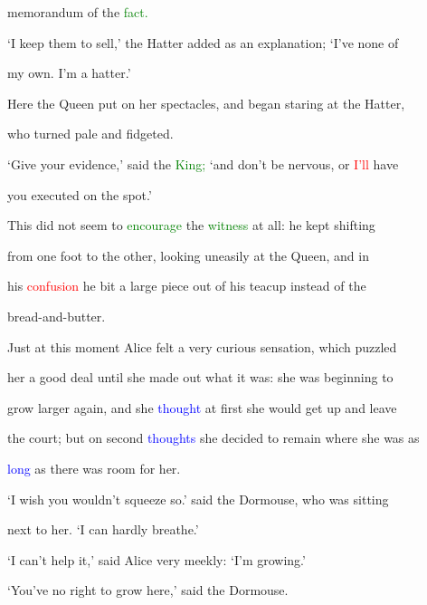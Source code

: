  memorandum of the \textcolor{green}{fact.}



 ‘I keep them to sell,’ the Hatter added as an explanation; ‘I’ve none of

 my own. I’m a hatter.’



 Here the Queen put on her \textcolor{BurntOrange}{spectacles,} and began \textcolor{BurntOrange}{staring} at the Hatter,

 who turned pale and fidgeted.



 ‘Give your evidence,’ said the \textcolor{green}{King;} ‘and don’t be \textcolor{BurntOrange}{nervous,} or \textcolor{red}{I’ll} have

 you executed on the spot.’



 This did not seem to \textcolor{green}{encourage} the \textcolor{green}{witness} at all: he kept shifting

 from one foot to the other, looking uneasily at the Queen, and in

 his \textcolor{red}{confusion} he bit a large piece out of his teacup instead of the

 bread-and-butter.



 Just at this moment Alice felt a very curious sensation, which puzzled

 her a \textcolor{BurntOrange}{good} \textcolor{BurntOrange}{deal} until she made out what it was: she was beginning to

 \textcolor{BurntOrange}{grow} larger again, and she \textcolor{blue}{thought} at first she would get up and \textcolor{BurntOrange}{leave}

 the \textcolor{BurntOrange}{court;} but on second \textcolor{blue}{thoughts} she decided to remain where she was as

 \textcolor{blue}{long} as there was room for her.



 ‘I wish you wouldn’t squeeze so.’ said the Dormouse, who was sitting

 next to her. ‘I can hardly breathe.’



 ‘I can’t help it,’ said Alice very meekly: ‘I’m \textcolor{BurntOrange}{growing.’}



 ‘You’ve no right to \textcolor{BurntOrange}{grow} here,’ said the Dormouse.



